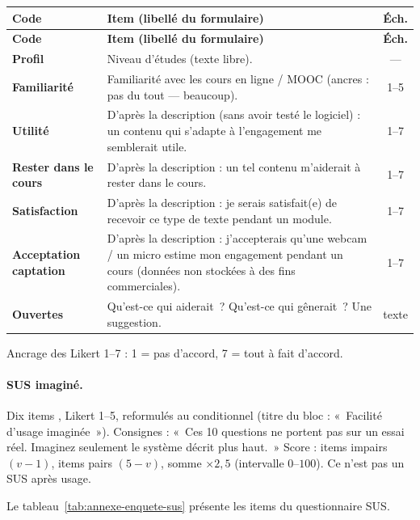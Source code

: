 {\small
\renewcommand{\arraystretch}{1.18}
\setlength{\tabcolsep}{4pt}
\begin{xltabular}{\textwidth}{|>{\bfseries}l|>{\raggedright\arraybackslash}X|c|}
\hline
{}
\textbf{Code} & \textbf{Item (libellé du formulaire)} & \textbf{Éch.} \\
\hline
\endfirsthead
\hline
{}
\textbf{Code} & \textbf{Item (libellé du formulaire)} & \textbf{Éch.} \\
\hline
\endhead
\endfoot
\endlastfoot
Profil & Niveau d'études (texte libre). & --- \\
\hline
Familiarité & Familiarité avec les cours en ligne / MOOC
(ancres : pas du tout --- beaucoup). & 1--5 \\
\hline
Utilité & D'après la description (sans avoir testé le logiciel) :
un contenu qui s'adapte à l'engagement me semblerait utile. & 1--7 \\
\hline
Rester dans le cours & D'après la description : un tel contenu
m'aiderait à rester dans le cours. & 1--7 \\
\hline
Satisfaction & D'après la description : je serais satisfait(e) de
recevoir ce type de texte pendant un module. & 1--7 \\
\hline
Acceptation captation & D'après la description : j'accepterais
qu'une webcam / un micro estime mon engagement pendant un cours
(données non stockées à des fins commerciales). & 1--7 \\
\hline
Ouvertes & Qu'est-ce qui aiderait~? Qu'est-ce qui gênerait~?
Une suggestion. & texte \\
\hline
\end{xltabular}
\label{tab:annexe-enquete-idee}
}

Ancrage des Likert 1--7 : 1 = pas d'accord, 7 = tout à fait d'accord.

\paragraph{SUS imaginé.} Dix items \textcite{brooke1996sus}, Likert
1--5, reformulés au conditionnel (titre du bloc : «~Facilité d'usage
imaginée~»). Consignes : «~Ces 10 questions ne portent pas sur un essai
réel. Imaginez seulement le système décrit plus haut.~» Score :
items impairs $(v-1)$, items pairs $(5-v)$, somme $\times 2{,}5$
(intervalle $0$--$100$). Ce n'est pas un SUS après usage.

Le tableau~\ref{tab:annexe-enquete-sus} présente les items du questionnaire SUS.

